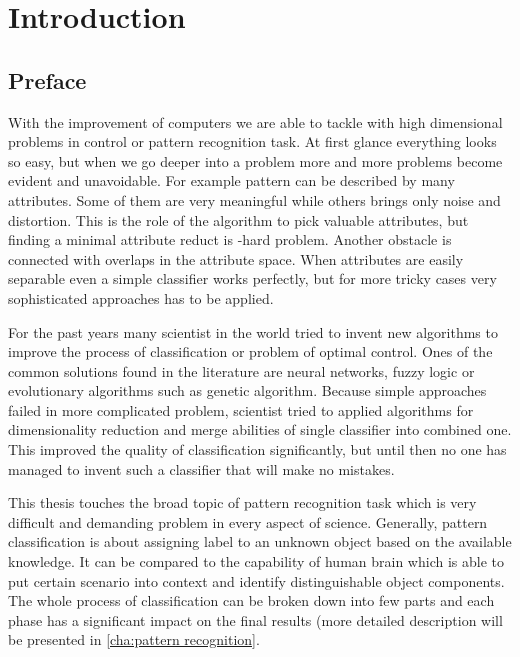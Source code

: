 \section{Introduction}
\subsection{Preface}
\label{cha:Goals}
With the improvement of computers we are able to tackle with high dimensional 
problems in control or pattern recognition task. At first glance everything
looks so easy, but when we go deeper into a problem more and more problems 
become evident and unavoidable. For example pattern can be described by many 
attributes. Some of them are very meaningful while others brings only noise 
and distortion. This is the role of the algorithm to pick valuable attributes,
but finding a minimal attribute reduct is -hard problem. Another
obstacle is connected with overlaps in the attribute space. When attributes 
are easily separable even a simple classifier works perfectly, but for more 
tricky cases very sophisticated approaches has to be applied.

For the past years many scientist in the world tried to invent new algorithms 
to improve the process of classification or problem of optimal control. Ones 
of the common solutions found in the literature are neural networks, fuzzy
logic or evolutionary algorithms such as genetic algorithm. Because simple 
approaches failed in more complicated problem, scientist tried to applied 
algorithms for dimensionality reduction and merge abilities of single
classifier into combined one. This improved the quality of classification 
significantly, but until then no one has managed to invent such a classifier 
that will make no mistakes.

This thesis touches the broad topic of pattern recognition task which is 
very difficult and demanding problem in every aspect of science. Generally, 
pattern classification is about assigning label to an unknown object based 
on the available knowledge. It can be compared to the capability of human 
brain which is able to put certain scenario into context and identify 
distinguishable object components. The whole process of classification can 
be broken down into few parts and each phase has a significant impact on the
final results (more detailed description will be presented in \ref{cha:pattern
recognition}.


